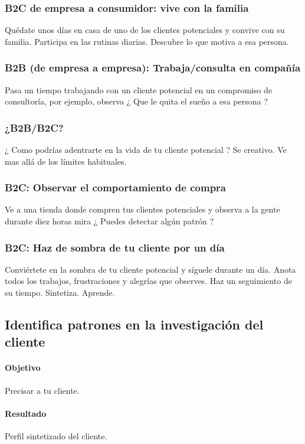 \documentclass[11pt]{book}
\begin{document}
\subsubsection{B2C de empresa a consumidor: vive con la familia}
Quédate unos días en casa de uno de los clientes potenciales y convive con su familia. Participa en las rutinas diarias. Descubre lo que motiva a esa persona.
\subsubsection{B2B (de empresa a empresa): Trabaja/consulta en compañía}
Pasa un tiempo trabajando con un cliente potencial en un compromiso de consultoría, por ejemplo, observa ¿ Que le quita el sueño a esa persona ?
\subsubsection{¿B2B/B2C?}
¿ Como podrías adentrarte en la vida de tu cliente potencial ? Se creativo. Ve mas allá de los límites habituales.
\subsubsection{B2C: Observar el comportamiento de compra}
Ve a una tienda donde compren tus clientes potenciales y observa a la gente durante diez horas mira ¿ Puedes detectar algún patrón ?
\subsubsection{B2C: Haz de sombra de tu cliente por un día}
Conviértete en la sombra de tu cliente potencial y síguele durante un día. Anota todos los trabajos, frustraciones y alegrías que observes. Haz un seguimiento de su tiempo. Sintetiza. Aprende. 
\subsection{Identifica patrones en la investigación del cliente}
\paragraph{Objetivo}
Precisar a tu cliente.
\paragraph{Resultado}
Perfil sintetizado del cliente.
\end{document}
